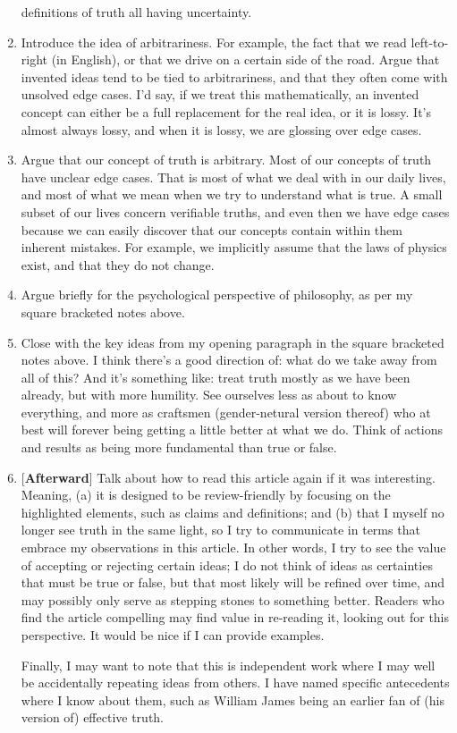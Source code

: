 \documentclass[11pt, oneside]{article}   	%
\begin{document}
\begin{enumerate}
        definitions of truth all having uncertainty.
    \item Introduce the idea of arbitrariness. For example, the fact that we
        read left-to-right (in English), or that we drive on a certain side of
        the road. Argue that invented ideas tend to be tied to arbitrariness,
        and that they often come with unsolved edge cases. I'd say, if we treat
        this mathematically, an invented concept can either be a full
        replacement for the real idea, or it is lossy. It's almost always lossy,
        and when it is lossy, we are glossing over edge cases.
    \item Argue that our concept of truth is arbitrary. Most of our concepts of
        truth have unclear edge cases. That is most of what we deal with in our
        daily lives, and most of what we mean when we try to understand what is
        true. A small subset of our lives concern verifiable truths, and even
        then we have edge cases because we can easily discover that our concepts
        contain within them inherent mistakes. For example, we implicitly assume
        that the laws of physics exist, and that they do not change.
    \item Argue briefly for the psychological perspective of philosophy, as per
        my square bracketed notes above.
    \item Close with the key ideas from my opening paragraph in the square
        bracketed notes above.
        I think there's a good direction of: what do we take away from all of
        this? And it's something like: treat truth mostly as we have been
        already, but with more humility. See ourselves less as about to know
        everything, and more as craftsmen (gender-netural version thereof) who
        at best will forever being getting a little better at what we do. Think
        of actions and results as being more fundamental than true or false.
    \item{} [{\bf Afterward}] Talk about how to read this article again if it
        was interesting. Meaning, (a) it is designed to be review-friendly by
        focusing on the highlighted elements, such as claims and definitions;
        and (b) that I myself no longer see truth in the same light, so I try to
        communicate in terms that embrace my observations in this article. In
        other words, I try to see the value of accepting or rejecting certain
        ideas; I do not think of ideas as certainties that must be true or
        false, but that most likely will be refined over time, and may possibly
        only serve as stepping stones to something better. Readers who find the
        article compelling may find value in re-reading it, looking out for this
        perspective. It would be nice if I can provide examples.

        Finally, I may want to note that this is independent work where I may
        well be accidentally repeating ideas from others. I have named specific
        antecedents where I know about them, such as William James being an
        earlier fan of (his version of) effective truth.
\end{enumerate}
\end{document}
